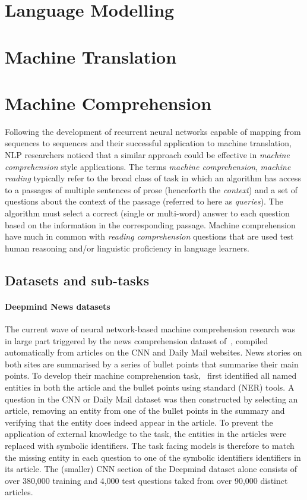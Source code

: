 \documentclass[11pt,letterpaper]{article}
\begin{document}
\cite{miikkulainen1993subsymbolic}

\section{Language Modelling}

\section{Machine Translation}

\section{Machine Comprehension}

Following the development of recurrent neural networks capable of mapping from sequences to sequences and their successful application to machine translation, NLP researchers noticed that a similar approach could be effective in \emph{machine comprehension} style applications. The terms \emph{machine comprehension}, \emph{machine reading} typically refer to the broad class of task in which an algorithm has access to a passages of multiple sentences of prose (henceforth the \emph{context}) and a set of questions about the context of the passage (referred to here as \emph{queries}). The algorithm must select a correct (single or multi-word) answer to each question based on the information in the corresponding passage.  Machine comprehension have much in common with \emph{reading comprehension} questions that are used test human reasoning and/or linguistic proficiency in language learners. 

\subsection{Datasets and sub-tasks}
\paragraph{Deepmind News datasets} The current wave of neural network-based machine comprehension research was in large part triggered by the news comprehension dataset of~, compiled automatically from articles on the CNN and Daily Mail websites. News stories on both sites are summarised by a series of bullet points that summarise their main points. To develop their machine comprehension task,~\cite{hermann2015teaching} first identified all named entities in both the article and the bullet points using standard (NER) tools. A question in the CNN or Daily Mail dataset was then constructed by selecting an article, removing an entity from one of the bullet points in the summary and verifying that the entity does indeed appear in the article. To prevent the application of external knowledge to the task, the entities in the articles were replaced with symbolic identifiers. The task facing models is therefore to match the missing entity in each question to one of the symbolic identifiers identifiers in its article. The (smaller) CNN section of the Deepmind dataset alone consists of over 380,000 training and 4,000 test questions taked from over 90,000 distinct articles.
\end{document}
